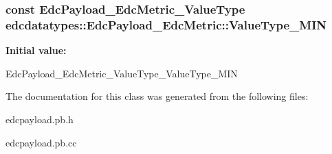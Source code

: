 \hypertarget{classedcdatatypes_1_1_edc_payload___edc_metric_a0ff5a19240173423a96738766b92229b}{
\subsubsection[{Value\-Type\-\_\-\-M\-I\-N}]{\setlength{\rightskip}{0pt plus 5cm}const Edc\-Payload\-\_\-\-Edc\-Metric\-\_\-\-Value\-Type edcdatatypes\-::\-Edc\-Payload\-\_\-\-Edc\-Metric\-::\-Value\-Type\-\_\-\-M\-I\-N\hspace{0.3cm}{\ttfamily [static]}}}\label{classedcdatatypes_1_1_edc_payload___edc_metric_a0ff5a19240173423a96738766b92229b}
{\bfseries Initial value\-:}
\begin{DoxyCode}

    EdcPayload\_EdcMetric\_ValueType\_ValueType\_MIN
\end{DoxyCode}


The documentation for this class was generated from the following files\-:\begin{DoxyCompactItemize}
\item 
edcpayload.\-pb.\-h\item 
edcpayload.\-pb.\-cc\end{DoxyCompactItemize}
